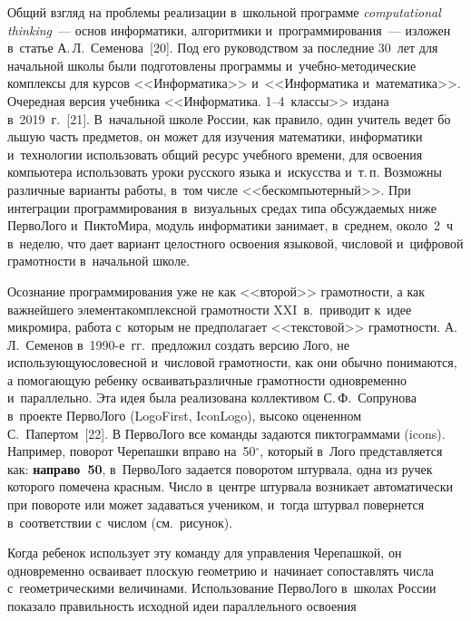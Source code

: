 \begin{multicols}{2}
  Общий взгляд на проблемы реализации в~школьной программе 
\textit{computational thinking}~--- основ информатики, алгоритмики и~программирования~---
 изложен в~статье А.\,Л.~Семенова~[20]. Под его 
руководством за последние 30~лет для начальной школы были подготовлены 
программы  
и~учеб\-но-ме\-то\-ди\-че\-ские комплексы для курсов <<Информатика>> и~<<Информатика 
и~математика>>. Очередная версия учебника 
<<Информатика. 1--4~классы>> издана в~2019~г.~[21]. В~начальной школе 
России, как правило, один учитель ведет б$\acute{\mbox{о}}$льшую часть 
предметов, он может для изучения математики, информатики и~технологии использовать 
общий ресурс учебного времени, для освоения 
компьютера использовать уроки русского языка и~искусства и~т.\,п. Возможны различные 
варианты работы, в~том числе <<бескомпьютерный>>. При интеграции 
программирования в~визуальных средах типа обсуждаемых ниже \mbox{ПервоЛого} 
и~ПиктоМира, модуль информатики занимает, в~среднем, около~2~ч в~неделю,
 что дает вариант целостного освоения языковой, числовой и~цифровой грамотности в~начальной школе.
  
  Осознание программирования уже не как <<второй>> грамотности, а как 
важнейшего элемента\linebreak комплексной грамотности XXI~в.\ приводит к~идее 
микромира, работа с~которым не предполагает %
 <<текс\-то\-вой>> грамотности. 
А.\,Л.~Семенов в~\mbox{1990-е~гг.}\ предложил создать версию Лого, не 
исполь\-зу\-ющую\linebreak словесной и~числовой грамотности, как они обычно 
понимаются, а помогающую ребенку осваивать\linebreak различные грамотности 
одновременно и~параллельно. Эта идея была реализована коллективом\linebreak 
С.\,Ф.~Сопрунова в~проекте ПервоЛого (LogoFirst, IconLogo), высоко 
оцененном С.~Папертом~[22]. В ПервоЛого все команды задаются 
пиктограммами (icons). Например, поворот Черепашки вправо на~50$^\circ$, 
который в~Лого представляется как: \textbf{направо~50}, в~ПервоЛого 
задается поворотом штурвала, одна из ручек которого помечена красным. 
Число в~центре штурвала возникает автоматически при повороте или может 
задаваться учеником, и~тогда штурвал повернется в~соответствии с~числом 
(см.\ рисунок).



 
  Когда ребенок использует эту команду для управ\-ле\-ния Черепашкой, он 
одновременно осваивает плоскую геометрию и~начинает сопоставлять числа 
с~геометрическими величинами. Использование ПервоЛого в~школах России 
показало правильность исходной идеи параллельного освоения\linebreak\vspace*{-12pt}


\end{multicols}

